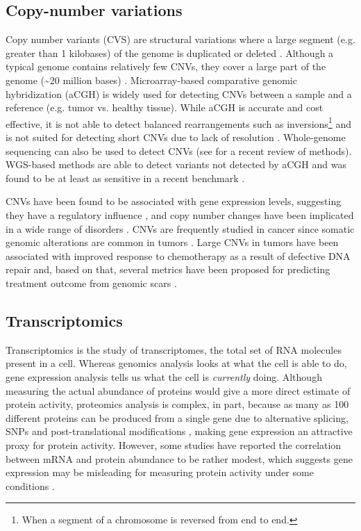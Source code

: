 \subsection{Copy-number variations}
Copy number variants (CVS) are structural variations where a large segment (e.g. greater than 1 kilobases) of the genome is duplicated or deleted \cite{Redon2006}. Although a typical genome contains relatively few CNVs, they cover a large part of the genome (\sim{}20 million bases) \cite{genomes1k2015}. Microarray-based comparative genomic hybridization (aCGH) is widely used for detecting CNVs between a sample and a reference (e.g. tumor vs. healthy tissue). While aCGH is accurate and cost effective, it is not able to detect balanced rearrangements such as inversions\footnote{When a segment of a chromosome is reversed from end to end.} and is not suited for detecting short CNVs due to lack of resolution \cite{Duan2013}. Whole-genome sequencing can also be used to detect CNVs (see \citeauthor{Zhang2019} \cite{Zhang2019} for a recent review of methods). WGS-based methods are able to detect variants not detected by aCGH and was found to be at least as sensitive in a recent benchmark \cite{Gross2018}.

CNVs have been found to be associated with gene expression levels, suggesting they have a regulatory influence \cite{Stranger2007,Gamazon2015}, and copy number changes have been implicated in a wide range of disorders \cite{McCarroll2007,Girirajan2011}. CNVs are frequently studied in cancer since somatic genomic alterations are common in tumors \cite{Zack2013}. Large CNVs in tumors have been associated with improved response to chemotherapy as a result of defective DNA repair and, based on that, several metrics have been proposed for predicting treatment outcome from genomic scars \cite{Abkevich2012,Birkbak2012,Popova2012,Marquard2015}.

\subsection{Transcriptomics}
Transcriptomics is the study of transcriptomes, the total set of RNA molecules present in a cell. Whereas genomics analysis looks at what the cell is able to do, gene expression analysis tells us what the cell is \emph{currently} doing. Although measuring the actual abundance of proteins would give a more direct estimate of protein activity, proteomics analysis is complex, in part, because as many as 100 different proteins can be produced from a single gene due to alternative splicing, SNPs and post-translational modifications \cite{Ponomarenko2016}, making gene expression an attractive proxy for protein activity. However, some studies have reported the correlation between mRNA and protein abundance to be rather modest, which suggests gene expression may be misleading for measuring protein activity under some conditions \cite{Rogers2008,Maier2009,Schwanhaeusser2011,Ghazalpour2011}.

